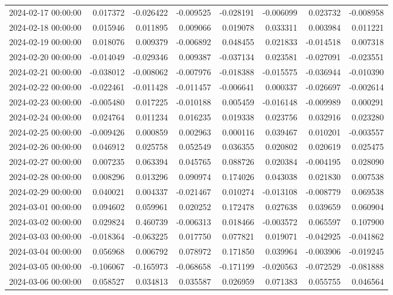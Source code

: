\begin{tabular}{lrrrrrrr}
2024-02-17 00:00:00 & 0.017372 & -0.026422 & -0.009525 & -0.028191 & -0.006099 & 0.023732 & -0.008958 \\
2024-02-18 00:00:00 & 0.015946 & 0.011895 & 0.009066 & 0.019078 & 0.033311 & 0.003984 & 0.011221 \\
2024-02-19 00:00:00 & 0.018076 & 0.009379 & -0.006892 & 0.048455 & 0.021833 & -0.014518 & 0.007318 \\
2024-02-20 00:00:00 & -0.014049 & -0.029346 & 0.009387 & -0.037134 & 0.023581 & -0.027091 & -0.023551 \\
2024-02-21 00:00:00 & -0.038012 & -0.008062 & -0.007976 & -0.018388 & -0.015575 & -0.036944 & -0.010390 \\
2024-02-22 00:00:00 & -0.022461 & -0.011428 & -0.011457 & -0.006641 & 0.000337 & -0.026697 & -0.002614 \\
2024-02-23 00:00:00 & -0.005480 & 0.017225 & -0.010188 & 0.005459 & -0.016148 & -0.009989 & 0.000291 \\
2024-02-24 00:00:00 & 0.024764 & 0.011234 & 0.016235 & 0.019338 & 0.023756 & 0.032916 & 0.023280 \\
2024-02-25 00:00:00 & -0.009426 & 0.000859 & 0.002963 & 0.000116 & 0.039467 & 0.010201 & -0.003557 \\
2024-02-26 00:00:00 & 0.046912 & 0.025758 & 0.052549 & 0.036355 & 0.020802 & 0.020619 & 0.025475 \\
2024-02-27 00:00:00 & 0.007235 & 0.063394 & 0.045765 & 0.088726 & 0.020384 & -0.004195 & 0.028090 \\
2024-02-28 00:00:00 & 0.008296 & 0.013296 & 0.090974 & 0.174026 & 0.043038 & 0.021830 & 0.007538 \\
2024-02-29 00:00:00 & 0.040021 & 0.004337 & -0.021467 & 0.010274 & -0.013108 & -0.008779 & 0.069538 \\
2024-03-01 00:00:00 & 0.094602 & 0.059961 & 0.020252 & 0.172478 & 0.027638 & 0.039659 & 0.060904 \\
2024-03-02 00:00:00 & 0.029824 & 0.460739 & -0.006313 & 0.018466 & -0.003572 & 0.065597 & 0.107900 \\
2024-03-03 00:00:00 & -0.018364 & -0.063225 & 0.017750 & 0.077821 & 0.019071 & -0.042925 & -0.041862 \\
2024-03-04 00:00:00 & 0.056968 & 0.006792 & 0.078972 & 0.171850 & 0.039964 & -0.003906 & -0.019245 \\
2024-03-05 00:00:00 & -0.106067 & -0.165973 & -0.068658 & -0.171199 & -0.020563 & -0.072529 & -0.081888 \\
2024-03-06 00:00:00 & 0.058527 & 0.034813 & 0.035587 & 0.026959 & 0.071383 & 0.055755 & 0.046564 \\

\end{tabular}
